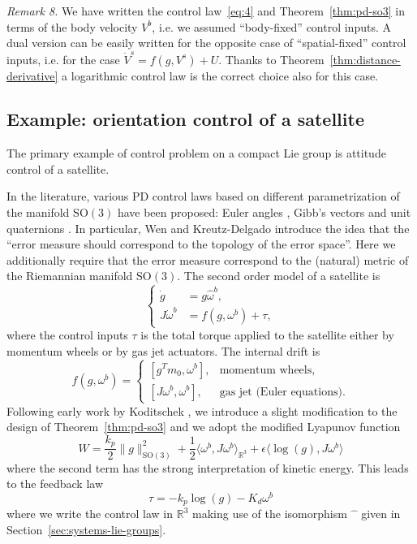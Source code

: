 \documentclass[10pt,twocolumn]{article}
\newcommand{\SO}{\mathrm{SO}}
\newcommand{\R}{\mathbb R}
\newcounter{paperitem}
\newcommand{\paperhead}[3]{\refstepcounter{paperitem}\par\medskip\noindent\textit{#1}\label{#3} #2\par}
\begin{document}
\paperhead{Remark 8.}{We have written the control law~\eqref{eq:4} and Theorem~\ref{thm:pd-so3} in terms of the body velocity $V^b$, i.e. we assumed ``body-fixed'' control inputs. A dual version can be easily written for the opposite case of ``spatial-fixed'' control inputs, i.e. for the case $\dot V^s=f(g,V^s)+U$. Thanks to Theorem~\ref{thm:distance-derivative} a logarithmic control law is the correct choice also for this case.}{rem:body-spatial-control}

\subsection{Example: orientation control of a satellite}\label{subsec:satellite-orientation}
The primary example of control problem on a compact Lie group is attitude control of a satellite.

In the literature, various PD control laws based on different parametrization of the manifold $\SO(3)$ have been proposed: Euler angles \cite{11}, Gibb's vectors \cite{12} and unit quaternions \cite{13}. In particular, Wen and Kreutz-Delgado \cite{13} introduce the idea that the ``error measure should correspond to the topology of the error space''. Here we additionally require that the error measure correspond to the (natural) metric of the Riemannian manifold $\SO(3)$. The second order model of a satellite is
\begin{equation*}
\left\{\begin{aligned}
\dot g&=g\widehat\omega^b,\\
J\dot\omega^b&=f(g,\omega^b)+\tau,
\end{aligned}\right.
\end{equation*}
where the control inputs $\tau$ is the total torque applied to the satellite either by momentum wheels or by gas jet actuators. The internal drift is
\begin{equation*}
f(g,\omega^b)=
\begin{cases}
[g^Tm_0,\omega^b],&\text{momentum wheels},\\
[J\omega^b,\omega^b],&\text{gas jet (Euler equations)}.
\end{cases}
\end{equation*}
Following early work by Koditschek \cite{14}, we introduce a slight modification to the design of Theorem~\ref{thm:pd-so3} and we adopt the modified Lyapunov function
\begin{equation*}
W=\frac{k_p}{2}\|g\|_{\SO(3)}^2+\frac12\langle\omega^b,J\omega^b\rangle_{\R^3}
+\epsilon\langle\log(g),J\omega^b\rangle
\end{equation*}
where the second term has the strong interpretation of kinetic energy. This leads to the feedback law
\begin{equation*}
\tau=-k_p\log(g)-K_d\omega^b\tag{7}\label{eq:7}
\end{equation*}
where we write the control law in $\R^3$ making use of the isomorphism $\widehat{\phantom{x}}$ given in Section~\ref{sec:systems-lie-groups}.
\end{document}
